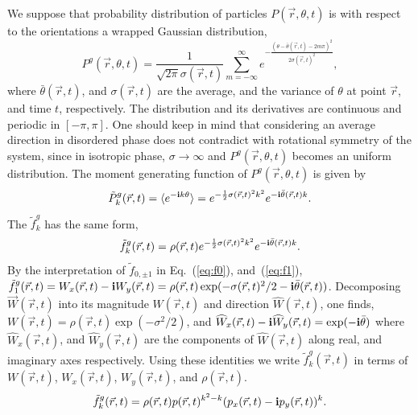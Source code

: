 \documentclass[reprint,floatfix,amsmath,amssymb,aps,pre,showkeys,showpacs,superscriptaddress]{revtex4-1}
\newcommand{\ave}[1]{\langle #1 \rangle}
\newcommand{\p}{p}
\newcommand{\im}{{\rm \bf i}}
\newcommand{\w}{W}
\newcommand{\vw}{\vec{\w}}
\newcommand{\hl}[1]{\textcolor{hlcolor}{#1}}
\newcommand{\reqs}[2]{Eq.~(\ref{#1}), and~(\ref{#2})}
\begin{document}
We suppose that \hl{probability} distribution of particles $P(\vec{r},\theta,t)$ is \hl{with respect to the orientations} a wrapped Gaussian distribution,
\begin{equation}
P^{g}(\vec{r},\theta,t) = \frac{1}{\sqrt{2 \pi} \sigma(\vec{r},t)} \sum_{m=-\infty}^{\infty} e^{-\frac{(\theta-\bar{\theta}(\vec{r},t) - 2 m \pi)^2}{2\sigma(\vec{r},t)^2}},
\label{eq:Wrapped-Gaussian}
\end{equation}
where $\bar{\theta}(\vec{r},t)$, and $\sigma(\vec{r},t)$ are the average, and the variance of $\theta$ at point $\vec{r}$, and time $t$, respectively. \hl{The distribution and its derivatives are continuous and periodic in $[-\pi,\pi]$}. One should keep in mind that considering an average direction in disordered phase does not contradict with rotational symmetry of the system, since in isotropic phase, $\sigma \to \infty$ and $P^g(\vec{r},\theta,t)$ becomes an uniform distribution. The moment generating function of $P^g(\vec{r},\theta,t)$ is given by
\begin{equation}
\tilde{P}^g_k(\vec{r},t) = \ave{e^{-\im k \theta}} = e^{-\frac{1}{2} \sigma(\vec{r},t)^2 k^2 } e^{-\im \bar{\theta}(\vec{r},t) k}.
\label{eq:moment-generator-Pk}
\end{equation}
The $\tilde{f}^g_k$ has the same form,
\begin{equation}
\tilde{f}^g_k(\vec{r},t) = \rho(\vec{r},t) e^{-\frac{1}{2} \sigma(\vec{r},t)^2 k^2 } e^{-\im \bar{\theta}(\vec{r},t) k}.
\end{equation}
By the interpretation of $\tilde{f}_{0,\pm 1}$ in \reqs{eq:f0}{eq:f1}, \hl{$\tilde{f}^g_1(\vec{r},t) = \w_x(\vec{r},t) - \im \w_y(\vec{r},t) = \rho(\vec{r},t) \exp(-\sigma(\vec{r},t)^2/2 - \im \bar{\theta}(\vec{r},t))$}. Decomposing \hl{$\vw(\vec{r},t)$} into its magnitude \hl{$\w(\vec{r},t)$} and direction \hl{$\widehat{\w}(\vec{r},t)$}, one finds, \hl{$\w(\vec{r},t) = \rho(\vec{r},t) \exp(-\sigma^2/2)$}, and \hl{$\widehat{\w}_x(\vec{r},t) - \im \widehat{\w}_y(\vec{r},t) = \exp(-\im \bar{\theta})$} where \hl{$\widehat{\w}_x(\vec{r},t)$}, and \hl{$\widehat{\w}_y(\vec{r},t)$} are the components of \hl{$\widehat{\w}(\vec{r},t)$} along \hl{real, and imaginary axes} respectively. Using these identities we write $\tilde{f}^g_k(\vec{r},t)$ in terms of \hl{$\w(\vec{r},t)$, $\w_x(\vec{r},t)$, $\w_y(\vec{r},t)$}, and $\rho(\vec{r},t)$.
\begin{equation}
\tilde{f}^g_k(\vec{r},t) = \rho(\vec{r},t) \p(\vec{r},t)^{k^2 - k} (\p_x(\vec{r},t) - \im \p_y(\vec{r},t))^k.
\label{eq:Gaussian-fk}
\end{equation}
\end{document}
